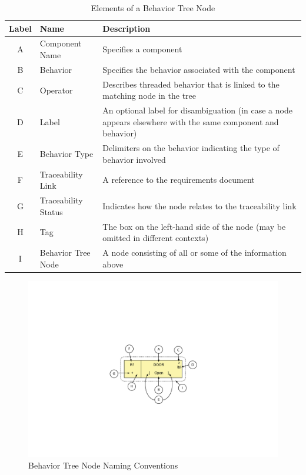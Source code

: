 \documentclass[]{article}
\begin{document}
\begin{table}
\begin{tabularx}{\textwidth}{|c|l|X|}
\textbf{Label} & \textbf{Name} & \textbf{Description}\\ \hline
A & Component Name & Specifies a component\\ \hline
B & Behavior & Specifies the behavior associated with the component\\ \hline
C &Operator & Describes threaded behavior that is linked to the matching node in the tree\\ \hline
D &Label & An optional label for disambiguation (in case a node appears elsewhere with the same component and behavior)\\ \hline
E &Behavior Type & Delimiters on the behavior indicating the type of behavior involved\\ \hline
F & Traceability Link & A reference to the requirements document\\ \hline
G & Traceability Status & Indicates how the node relates to the traceability link\\ \hline
H &Tag & The box on the left-hand side of the node (may be omitted in different contexts)\\ \hline
I & Behavior Tree Node & A node consisting of all or some of the information above
\end{tabularx}


\caption{Elements of a Behavior Tree Node}
\label{tbl:BTNodeElements}
\end{table}

\begin{figure}
 \includegraphics{figs/AppendixB/Naming/Fig1}
 \caption{Behavior Tree Node Naming Conventions}
 \label{fig:Naming1}
\end{figure}
\end{document}
